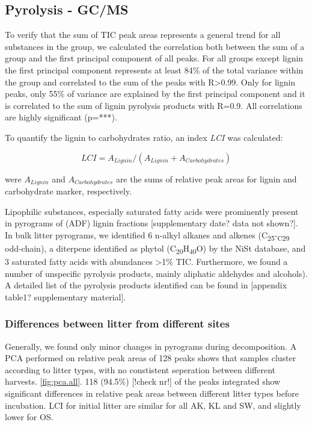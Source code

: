 \subsection{Pyrolysis - GC/MS}

To verify that the sum of TIC peak areas represents a general trend for all substances in the group, we calculated the correlation both between the sum of a group and the first principal component of all peaks. For all groups except lignin the first principal component represents at least 84\% of the total variance within the group and correlated to the sum of the peaks with R\textgreater 0.99. Only for lignin peaks, only 55\% of variance are explained by the first principal component and it is correlated to the sum of lignin pyrolysis products with R=0.9. All correlations are highly significant (p=***). 

To quantify the lignin to carbohydrates ratio, an index \emph{LCI} was calculated: 

\begin{equation}
LCI = A_{Lignin} / (A_{Lignin} + A_{Carbohydrates})
\end{equation}

were $A_{Lignin}$ and $A_{Carbohydrates}$ are the sums of relative peak areas for lignin and carbohydrate marker, respectively.

Lipophilic substances, especially saturated fatty acids were prominently present in pyrograms of (ADF) lignin fractions [supplementary date? data not shown?]. In bulk litter pyrograms, we identified 6 n-alkyl alkanes and alkenes (C\textsubscript{25}-\textsubscript{C29} odd-chain), a diterpene identified as phytol (C\textsubscript{20}H\textsubscript{40}O) by the NiSt database, and 3 saturated fatty acids with abundances \textgreater 1\% TIC. Furthermore, we found a number of unspecific pyrolysis products, mainly aliphatic aldehydes and alcohols). A detailed list of the pyrolysis products identified can be found in [appendix table1? supplementary material].

\subsubsection{Differences between litter from different sites}

Generally, we found only minor changes in pyrograms during decomposition. A PCA performed on relative peak areas of 128 peaks shows that samples cluster according to litter types, with no constistent seperation between different harvests. \ref{fig:pca.all}. 118 (94.5\%) [!check nr!] of the peaks integrated show significant differences in relative peak areas between different litter types before incubation. LCI for initial litter are similar for all AK, KL and SW, and slightly lower for OS.

